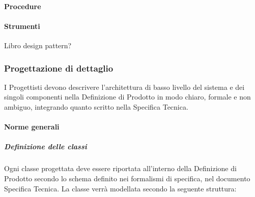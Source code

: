\paragraph{Procedure}

\paragraph{Strumenti}
Libro design pattern?

\subsubsection{Progettazione di dettaglio}

I Progettisti devono descrivere l'architettura di basso livello del sistema e dei singoli componenti nella Definizione di Prodotto in modo chiaro, formale e non ambiguo, integrando quanto scritto nella Specifica Tecnica.


\paragraph{Norme generali}
\subparagraph{Definizione delle classi}
\label{}


Ogni classe progettata deve essere riportata all'interno della Definizione di Prodotto secondo lo schema definito nei formalismi di specifica, nel documento Specifica Tecnica. La classe verrà modellata secondo la seguente struttura:

